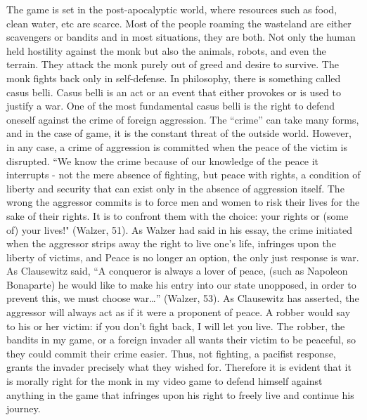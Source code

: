 \documentclass[10pt,twocolumn]{article}
\begin{document}
The game is set in the post-apocalyptic world, where resources such as food, clean water, etc are scarce. Most of the people roaming the wasteland are either scavengers or bandits and in most situations, they are both. Not only the human held hostility against the monk but also the animals, robots, and even the terrain. They attack the monk purely out of greed and desire to survive. The monk fights back only in self-defense. In philosophy, there is something called casus belli. Casus belli is an act or an event that either provokes or is used to justify a war. One of the most fundamental casus belli is the right to defend oneself against the crime of foreign aggression. The “crime” can take many forms, and in the case of game, it is the constant threat of the outside world. However, in any case, a crime of aggression is committed when the peace of the victim is disrupted. “We know the crime because of our knowledge of the peace it interrupts - not the mere absence of fighting, but peace with rights, a condition of liberty and security that can exist only in the absence of aggression itself. The wrong the aggressor commits is to force men and women to risk their lives for the sake of their rights. It is to confront them with the choice: your rights or (some of) your lives!" (Walzer, 51). As Walzer had said in his essay, the crime initiated when the aggressor strips away the right to live one's life, infringes upon the liberty of victims, and Peace is no longer an option, the only just response is war. As Clausewitz said, “A conqueror is always a lover of peace, (such as Napoleon Bonaparte) he would like to make his entry into our state unopposed, in order to prevent this, we must choose war…” (Walzer, 53). As Clausewitz has asserted, the aggressor will always act as if it were a proponent of peace. A robber would say to his or her victim: if you don't fight back, I will let you live. The robber, the bandits in my game, or a foreign invader all wants their victim to be peaceful, so they could commit their crime easier. Thus, not fighting, a pacifist response, grants the invader precisely what they wished for. Therefore it is evident that it is morally right for the monk in my video game to defend himself against anything in the game that infringes upon his right to freely live and continue his journey.
\end{document}
